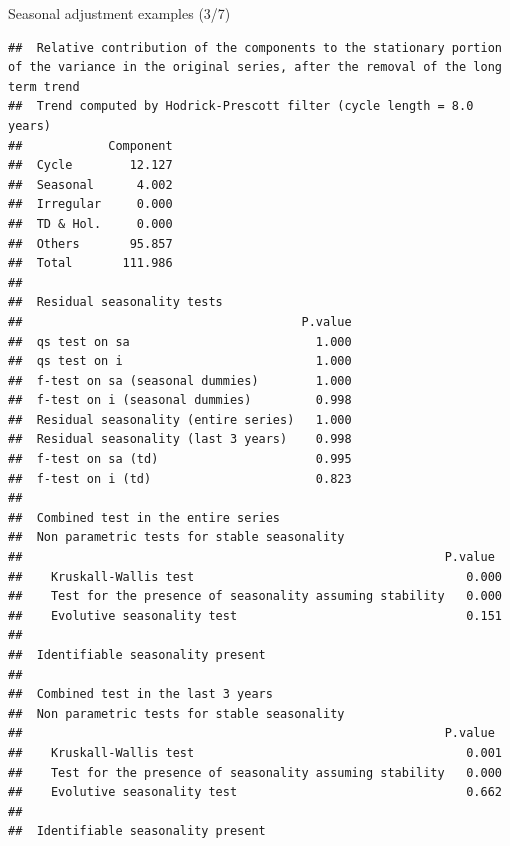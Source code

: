 \documentclass[10pt,xcolor=table,color={dvipsnames,usenames},ignorenonframetext,usepdftitle=false,french]{beamer}
\newenvironment{Shaded}{\begin{snugshade}}{\end{snugshade}}
\newcommand{\KeywordTok}[1]{\textcolor[rgb]{0.13,0.29,0.53}{\textbf{#1}}}
\newcommand{\DataTypeTok}[1]{\textcolor[rgb]{0.13,0.29,0.53}{#1}}
\newcommand{\OtherTok}[1]{\textcolor[rgb]{0.56,0.35,0.01}{#1}}
\newcommand{\OperatorTok}[1]{\textcolor[rgb]{0.81,0.36,0.00}{\textbf{#1}}}
\newcommand{\NormalTok}[1]{#1}
\begin{document}
\begin{frame}[fragile]{Seasonal adjustment examples (3/7)}

\footnotesize

\begin{Shaded}
\end{Shaded}

\begin{verbatim}
##  Relative contribution of the components to the stationary portion of the variance in the original series, after the removal of the long term trend 
##  Trend computed by Hodrick-Prescott filter (cycle length = 8.0 years)
##            Component
##  Cycle        12.127
##  Seasonal      4.002
##  Irregular     0.000
##  TD & Hol.     0.000
##  Others       95.857
##  Total       111.986
## 
##  Residual seasonality tests 
##                                       P.value
##  qs test on sa                          1.000
##  qs test on i                           1.000
##  f-test on sa (seasonal dummies)        1.000
##  f-test on i (seasonal dummies)         0.998
##  Residual seasonality (entire series)   1.000
##  Residual seasonality (last 3 years)    0.998
##  f-test on sa (td)                      0.995
##  f-test on i (td)                       0.823
## 
##  Combined test in the entire series 
##  Non parametric tests for stable seasonality
##                                                           P.value
##    Kruskall-Wallis test                                      0.000
##    Test for the presence of seasonality assuming stability   0.000
##    Evolutive seasonality test                                0.151
##  
##  Identifiable seasonality present
## 
##  Combined test in the last 3 years 
##  Non parametric tests for stable seasonality
##                                                           P.value
##    Kruskall-Wallis test                                      0.001
##    Test for the presence of seasonality assuming stability   0.000
##    Evolutive seasonality test                                0.662
##  
##  Identifiable seasonality present
\end{verbatim}

\end{frame}
\end{document}
